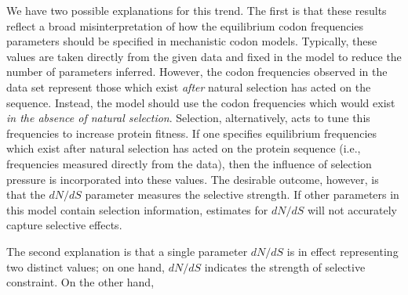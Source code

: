 \documentclass[11pt]{article}
\begin{document}
We have two possible explanations for this trend.
The first is that these results reflect a broad misinterpretation of how the equilibrium codon frequencies parameters should be specified in mechanistic codon models. Typically, these values are taken directly from the given data and fixed in the model to reduce the number of parameters inferred. However, the codon frequencies observed in the data set represent those which exist \textit{after} natural selection has acted on the sequence. Instead, the model should use the codon frequencies which would exist \textit{in the absence of natural selection}. Selection, alternatively, acts to tune this frequencies to increase protein fitness. If one specifies equilibrium frequencies which exist after natural selection has acted on the protein sequence (i.e., frequencies measured directly from the data), then the influence of selection pressure is incorporated into these values. The desirable outcome, however, is that the $dN/dS$ parameter measures the selective strength. If other parameters in this model contain selection information, estimates for $dN/dS$ will not accurately capture selective effects.

The second explanation is that a single parameter $dN/dS$ is in effect representing two distinct values; on one hand, $dN/dS$ indicates the strength of selective constraint. On the other hand,  


\end{document}
